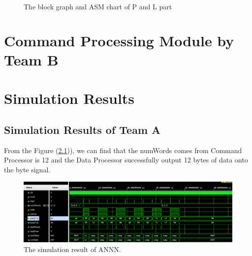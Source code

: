 \documentclass[11pt,a4paper]{report}
\begin{document}
\begin{figure}[!ht]
{    }
    \quad
    \caption{The block graph and ASM chart of P and L part\label{TeamA P and L}}
\end{figure}

\chapter{Command Processing Module by Team B}
\label{cap:Command Processing Module by Team B}


\chapter{Simulation Results}
\label{cap:Simulation results}

\section{Simulation Results of Team A}
\label{sec:Simulation Results of Team A}

From the Figure (\ref{TeamA ANNN all})), we can find that the numWords comes from Command Processor is 12 and the Data
 Processor successfully output 12 bytes of data onto the byte signal.

\begin{figure}[!ht]
    \begin{centering}
        \includegraphics[scale=0.5]{TeamA ANNN all.png}
        \par\end{centering}   
    \caption{The simulation result of ANNN.\label{TeamA ANNN all}}
\end{figure}   
\end{document}
